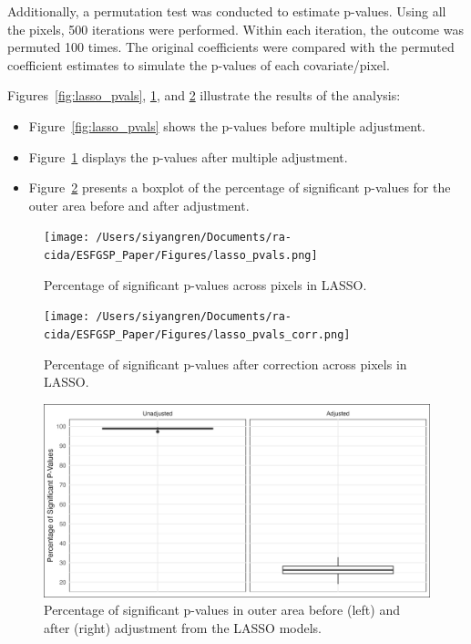 \documentclass[12pt]{article}
\begin{document}
Additionally, a permutation test was conducted to estimate p-values. Using all the pixels, 500 iterations were performed. Within each iteration, the outcome was permuted 100 times. The original coefficients were compared with the permuted coefficient estimates to simulate the p-values of each covariate/pixel.

Figures~\ref{fig:lasso_pvals}, \ref{fig:lasso_pvals_corr}, and \ref{fig:lasso_boxplot} illustrate the results of the analysis:
\begin{itemize}
    \item Figure~\ref{fig:lasso_pvals} shows the p-values before multiple adjustment.
    \item Figure~\ref{fig:lasso_pvals_corr} displays the p-values after multiple adjustment.
    \item Figure~\ref{fig:lasso_boxplot} presents a boxplot of the percentage of significant p-values for the outer area before and after adjustment.
\end{itemize}


\begin{figure}[h]
    \centering
    \begin{minipage}[b]{0.45\textwidth}
        \texttt{[image: /Users/siyangren/Documents/ra-cida/ESFGSP\_Paper/Figures/lasso\_pvals.png]}
        \caption{Percentage of significant p-values across pixels in LASSO.}
        \label{fig:lasso_pvals}
    \end{minipage}
    \hfill %
    \begin{minipage}[b]{0.45\textwidth}
        \texttt{[image: /Users/siyangren/Documents/ra-cida/ESFGSP\_Paper/Figures/lasso\_pvals\_corr.png]}
        \caption{Percentage of significant p-values after correction across pixels in LASSO.}
        \label{fig:lasso_pvals_corr}
    \end{minipage}
\end{figure}

\begin{figure}[h]
    \centering
    \includegraphics[width=\textwidth]{../Figures/lasso_boxplots.png}
    \caption{Percentage of significant p-values in outer area before (left) and after (right) adjustment from the LASSO models.}
    \label{fig:lasso_boxplot}
\end{figure}
\end{document}
